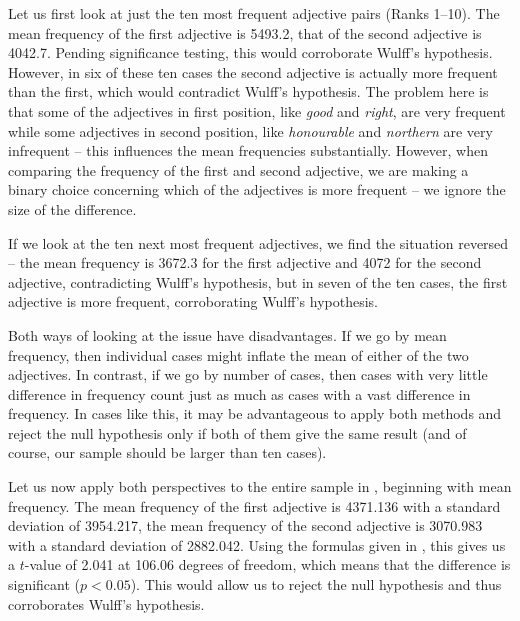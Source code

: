 Let us first look at just the ten most frequent adjective  pairs (Ranks 1--10). The mean  frequency  of the first adjective  is 5493.2, that of the second adjective  is 4042.7. Pending significance testing, this would corroborate Wulff's hypothesis. However, in six of these ten cases the second adjective  is actually more frequent than the first, which would contradict Wulff's hypothesis. The problem here is that some of the adjectives  in first position, like \textit{good} and \textit{right}, are very frequent while some adjectives  in second position, like \textit{honourable} and \textit{northern} are very infrequent -- this influences the mean  frequencies  substantially. However, when comparing the frequency of the first and second adjective,  we are making a binary choice concerning which of the adjectives  is more frequent -- we ignore the size of the difference.

If we look at the ten next most frequent adjectives,  we find the situation reversed -- the mean  frequency is 3672.3 for the first adjective  and 4072 for the second adjective,  contradicting Wulff's hypothesis, but in seven of the ten cases, the first adjective  is more frequent,  corroborating Wulff's hypothesis.

Both ways of looking at the issue have disadvantages. If we go by mean  frequency, then individual cases might inflate the mean of either of the two adjectives.  In contrast, if we go by number of cases, then cases with very little difference in frequency  count just as much as cases with a vast difference in frequency. In cases like this, it may be advantageous to apply both methods and reject the null hypothesis only if both of them give the same result (and of course, our sample should be larger than ten cases).

Let us now apply both perspectives to the entire sample in , beginning with mean  frequency. The mean frequency of the first adjective  is \num{4371.136} with a standard deviation of \num{3954.217}, the mean frequency of the second adjective  is \num{3070.983} with a standard deviation of \num{2882.042}. Using the formulas given in , this gives us a $t$-value of \num{2.041} at \num{106.06} degrees of freedom, which means that the difference is significant ($p < 0.05$). This would allow us to reject the null hypothesis and thus corroborates Wulff's hypothesis.

